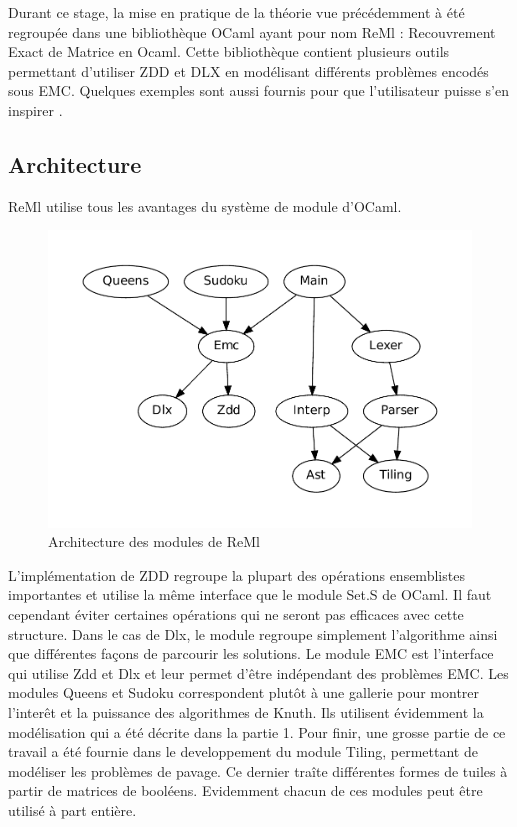 \documentclass[a4paper]{article}
\begin{document}
Durant ce stage, la mise en pratique de la théorie vue précédemment à été 
regroupée dans une 
bibliothèque OCaml ayant pour nom ReMl : Recouvrement Exact de Matrice en Ocaml.
Cette bibliothèque contient plusieurs outils permettant d'utiliser ZDD et DLX 
en modélisant différents problèmes encodés sous EMC.
Quelques exemples sont aussi fournis pour que l'utilisateur puisse s'en inspirer
.

\subsection{Architecture}

ReMl utilise tous les avantages du système de module d'OCaml. 

\begin{figure}[htp]
\begin{center}
\includegraphics[scale=0.5]{../imports/archi.pdf}
\end{center}
\caption{\label{fig:archi} Architecture des modules de ReMl}
\end{figure}

L'implémentation de ZDD regroupe la plupart des opérations ensemblistes 
importantes et utilise la même interface que le module Set.S de OCaml. Il faut
cependant éviter certaines opérations qui ne seront pas efficaces avec cette 
structure. 
Dans le cas de Dlx, le module regroupe simplement l'algorithme ainsi que 
différentes façons de parcourir les solutions. Le module EMC est l'interface qui
utilise Zdd et Dlx et leur permet d'être indépendant des problèmes EMC.
Les modules Queens et Sudoku correspondent plutôt à une gallerie pour montrer
l'interêt et la puissance des algorithmes de Knuth. Ils utilisent évidemment la 
modélisation qui a été décrite dans la partie 1. 
Pour finir, une grosse partie de ce travail a été fournie dans le developpement
du module Tiling, permettant de modéliser les problèmes de pavage. Ce dernier
traîte différentes formes de tuiles à partir de matrices de booléens. 
Evidemment chacun de ces modules peut être utilisé à part entière.
\end{document}
